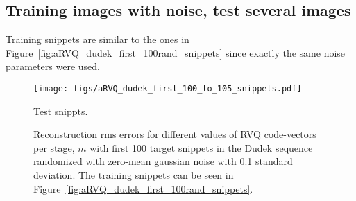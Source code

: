 \clearpage
\newpage
\subsection{Training images with noise, test several images}
Training snippets are similar to the ones in Figure~\ref{fig:aRVQ_dudek_first_100rand_snippets} since exactly the same noise parameters were used.


								\begin{figure}[h!]
								\centering
								\texttt{[image: figs/aRVQ\_dudek\_first\_100\_to\_105\_snippets.pdf]}
								\caption{Test snippts.}
								\label{fig:aRVQ_Dudek_first_100_rand}
								\end{figure}


								\begin{figure}[h]
								\centering
								\subtable{\begin{tiny}\end{tiny}}
								\caption{Reconstruction rms errors for different values of RVQ code-vectors per stage, $m$ with first 100 target snippets in the Dudek sequence randomized with zero-mean gaussian noise with 0.1 standard deviation.  The training snippets can be seen in Figure~\ref{fig:aRVQ_dudek_first_100rand_snippets}.}
								\label{fig:aRVQ_Dudek_first_100_rand}
								\end{figure}




\clearpage
\newpage
\normalsize


